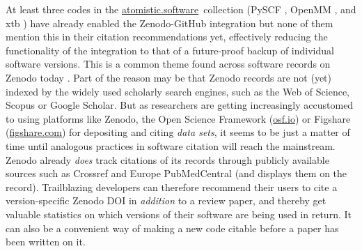 \documentclass[9pt,review,ASAPversion]{livecoms}
\newcommand{\atsoft}{\href{https://atomistic.software}{atomistic.software}\ }
\begin{document}

At least three codes in the \atsoft collection (PySCF \cite{Sun2020a,Sun2020b}, OpenMM \cite{Eastman2017,Eastman2020}, and xtb \cite{Bannwarth2021,Grimme2021}) have already enabled the Zenodo-GitHub integration but none of them mention this in their citation recommendations yet, effectively reducing the functionality of the integration to that of a future-proof backup of individual software versions.
This is a common theme found across software records on Zenodo today \cite{vandeSandt2019}.
Part of the reason may be that Zenodo records are not (yet) indexed by the widely used scholarly search engines, such as the Web of Science, Scopus or Google Scholar.
But as researchers are getting increasingly accustomed to using platforms like Zenodo, the Open Science Framework (\href{https://osf.io}{osf.io}) or Figshare (\href{https://figshare.com}{figshare.com}) for depositing and citing \emph{data sets}, it seems to be just a matter of time until analogous practices in software citation will reach the mainstream.
Zenodo already \emph{does} track citations of its records through publicly available sources such as Crossref and Europe PubMedCentral (and displays them on the record). 
Trailblazing developers can therefore recommend their users to cite a version-specific Zenodo DOI in \emph{addition} to a review paper, and thereby get valuable statistics on which versions of their software are being used in return.
It can also be a convenient way of making a new code citable before a paper has been written on it.
\end{document}
